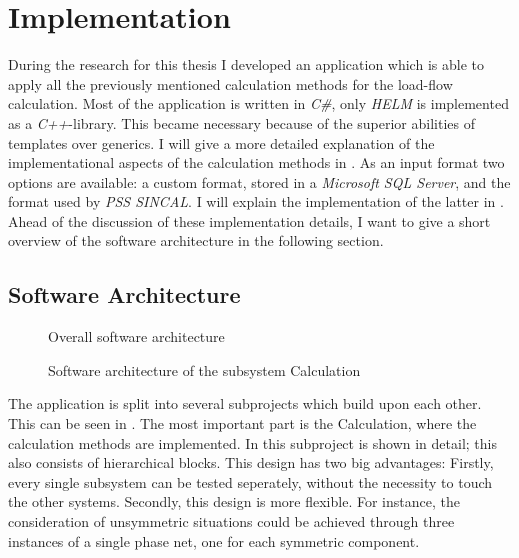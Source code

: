 \chapter{Implementation}
During the research for this thesis I developed an application which is able to apply all the previously mentioned calculation methods for the load-flow calculation. Most of the application is written in \emph{C\#}, only \emph{HELM} is implemented as a \emph{C++}-library. This became necessary because of the superior abilities of templates over generics. I will give a more detailed explanation of the implementational aspects of the calculation methods in .
As an input format two options are available: a custom format, stored in a \emph{Microsoft SQL Server}, and the format used by \emph{PSS SINCAL}. I will explain the implementation of the latter in . Ahead of the discussion of these implementation details, I want to give a short overview of the software architecture in the following section.

\section{Software Architecture}

\begin{figure}
	\centering
	
	\caption{Overall software architecture}
	\label{fig:software_architecture}
\end{figure}

\begin{figure}
	\centering
	
	\caption{Software architecture of the subsystem Calculation}
	\label{fig:calculation_architecture}
\end{figure}

The application is split into several subprojects which build upon each other. This can be seen in . The most important part is the Calculation, where the calculation methods are implemented. In  this subproject is shown in detail; this also consists of hierarchical blocks. This design has two big advantages: Firstly, every single subsystem can be tested seperately, without the necessity to touch the other systems. Secondly, this design is more flexible. For instance, the consideration of unsymmetric situations could be achieved through three instances of a single phase net, one for each symmetric component.

